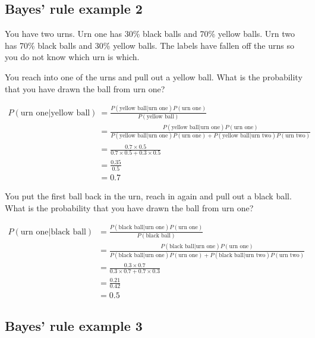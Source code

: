 \documentclass[
  letterpaper,
  DIV=11,
  numbers=noendperiod]{scrreprt}
\begin{document}
\hypertarget{bayes-rule-example-2}{%
\subsection{Bayes' rule example 2}\label{bayes-rule-example-2}}

You have two urns. Urn one has 30\% black balls and 70\% yellow balls.
Urn two has 70\% black balls and 30\% yellow balls. The labels have
fallen off the urns so you do not know which urn is which.

You reach into one of the urns and pull out a yellow ball. What is the
probability that you have drawn the ball from urn one?

\begin{align*}
P(\text{urn one}|\text{yellow ball})&=\frac{P(\text{yellow ball}|\text{urn one})P(\text{urn one})}{P(\text{yellow ball})} \\[6pt]
&=\frac{P(\text{yellow ball}|\text{urn one})P(\text{urn one})}{P(\text{yellow ball}|\text{urn one})P(\text{urn one})+P(\text{yellow ball}|\text{urn two})P(\text{urn two})} \\[6pt]
&=\frac{0.7\times 0.5}{0.7\times 0.5+0.3\times 0.5} \\[6pt]
&=\frac{0.35}{0.5} \\
&=0.7
\end{align*}

You put the first ball back in the urn, reach in again and pull out a
black ball. What is the probability that you have drawn the ball from
urn one?

\begin{align*}
P(\text{urn one}|\text{black ball})&=\frac{P(\text{black ball}|\text{urn one})P(\text{urn one})}{P(\text{black ball})} \\[6pt]
&=\frac{P(\text{black ball}|\text{urn one})P(\text{urn one})}{P(\text{black ball}|\text{urn one})P(\text{urn one})+P(\text{black ball}|\text{urn two})P(\text{urn two})} \\[6pt]
&=\frac{0.3\times 0.7}{0.3\times 0.7+0.7\times 0.3} \\[6pt]
&=\frac{0.21}{0.42} \\
&=0.5
\end{align*}

\hypertarget{bayes-rule-example-3}{%
\subsection{Bayes' rule example 3}\label{bayes-rule-example-3}}
\end{document}
